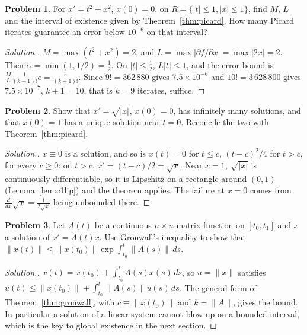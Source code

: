 \documentclass[11pt,a4paper]{article}
\numberwithin{equation}{section}
\theoremstyle{definition}
\newtheorem{problemx}{Problem}[subsection]
\newenvironment{problem}{\begin{problemx}}{\end{problemx}}
\newenvironment{solution}
  {\renewcommand{\qedsymbol}{}\begin{proof}[\textit{Solution}.]}
  {\end{proof}}
\begin{document}
\begin{problem}
For $x' = t^2 + x^2$, $x(0) = 0$, on $R = \{|t| \leq 1, |x| \leq 1\}$, find $M$, $L$ and the interval of existence given by Theorem~\ref{thm:picard}. How many Picard iterates guarantee an error below
$10^{-6}$ on that interval?
\end{problem}

\begin{solution}
$M = \max(t^2 + x^2) = 2$, and $L = \max|\partial f/\partial x| = \max|2x| = 2$. Then $\alpha = \min(1, 1/2) = \frac12$. On $|t| \leq \frac12$, $L|t| \leq 1$, and the error bound is $\frac ML\frac{1}{(k + 1)!}e = \frac{e}{(k + 1)!}$. Since
$9! = 362\,880$ gives $7.5 \times 10^{-6}$ and $10! = 3\,628\,800$ gives $7.5 \times 10^{-7}$, $k + 1 = 10$, that is $k = 9$ iterates, suffice.
\end{solution}

\begin{problem}
Show that $x' = \sqrt{|x|}$, $x(0) = 0$, has infinitely many solutions, and that $x(0) = 1$ has a unique solution near $t = 0$. Reconcile the two with Theorem~\ref{thm:picard}.
\end{problem}

\begin{solution}
$x \equiv 0$ is a solution, and so is $x(t) = 0$ for $t \leq c$, $(t - c)^2/4$ for $t > c$, for every $c \geq 0$: on $t > c$, $x' = (t - c)/2 = \sqrt{x}$. Near $x = 1$, $\sqrt{|x|}$ is continuously differentiable,
so it is Lipschitz on a rectangle around $(0, 1)$ (Lemma~\ref{lem:c1lip}) and the theorem applies. The failure at $x = 0$ comes from $\frac{d}{dx}\sqrt x = \frac{1}{2\sqrt x}$ being unbounded there.
\end{solution}

\begin{problem}
Let $A(t)$ be a continuous $n \times n$ matrix function on $[t_0, t_1]$ and $x$ a solution of $x' = A(t)x$. Use Gronwall's inequality to show that
$\|x(t)\| \leq \|x(t_0)\|\exp\int_{t_0}^t\|A(s)\|\,ds$.
\end{problem}

\begin{solution}
$x(t) = x(t_0) + \int_{t_0}^tA(s)x(s)\,ds$, so $u = \|x\|$ satisfies $u(t) \leq \|x(t_0)\| + \int_{t_0}^t\|A(s)\|u(s)\,ds$. The general form of Theorem~\ref{thm:gronwall}, with $c \equiv \|x(t_0)\|$ and $k = \|A\|$, gives the bound. In
particular a solution of a linear system cannot blow up on a bounded interval, which is the key to global existence in the next section.
\end{solution}
\end{document}
